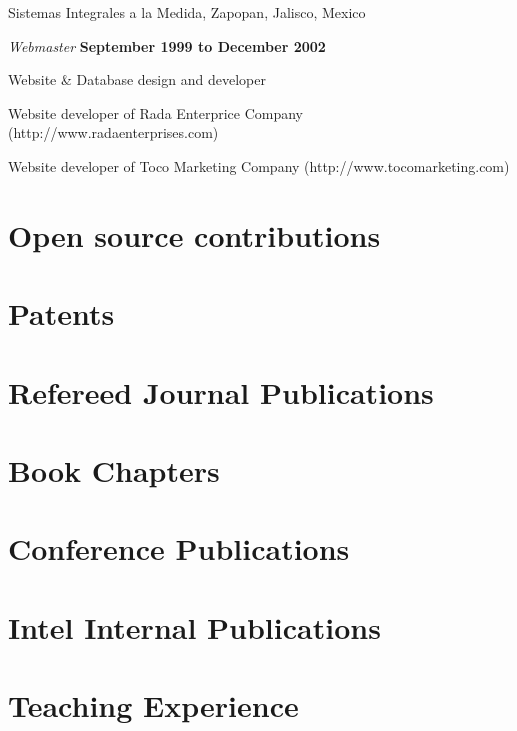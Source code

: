 \blankline

Sistemas Integrales a la Medida, Zapopan, Jalisco, Mexico 
\begin{outerlist}
\item[] \textit{Webmaster }%
    \hfill \textbf{September 1999 to December 2002 }
    \begin{innerlist}
        \item Website \& Database design and developer
        \item Website developer of Rada Enterprice Company
              (http://www.radaenterprises.com)
        \item Website developer of Toco Marketing Company
              (http://www.tocomarketing.com)
    \end{innerlist}
\end{outerlist}

\section{Open source contributions}


\section{Patents}

\blankline

\section{Refereed  Journal  Publications}

\blankline

\section{Book Chapters}

\blankline

\section{Conference  Publications}


\section{Intel Internal Publications}


\section{Teaching Experience}


